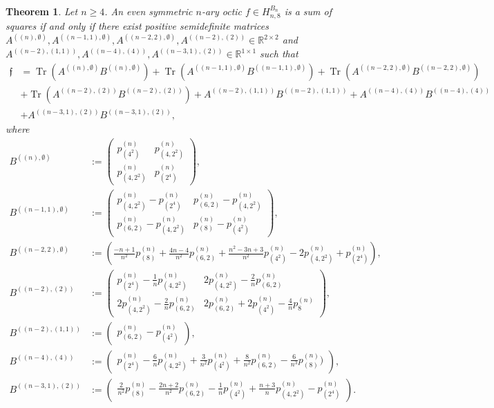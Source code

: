 \documentclass[11pt,a4paper]{amsart}
\numberwithin{equation}{section}
\newtheorem{thm}{Theorem}
\theoremstyle{definition}
\newcommand{\R}{\mathbb{R}}
\DeclareMathOperator{\Tr}{Tr}
\numberwithin{thm}{section}
\theoremstyle{break}
\numberwithin{subcase}{case}
\begin{document}
\begin{thm} \label{thm:EvenSymSOSOctics}
Let $n \geq 4$. An even symmetric $n$-ary octic $f \in H_{n,8}^{B_n}$ is a sum of squares if and only if there exist positive semidefinite matrices $A^{((n),\emptyset)},A^{((n-1,1),\emptyset)},A^{((n-2,2),\emptyset)},A^{((n-2),(2))} \in \R^{2 \times 2}$ and $A^{((n-2),(1,1))},A^{((n-4),(4))},A^{((n-3,1),(2))} \in \R^{1 \times 1}$ such that \begin{align*}
    \mathfrak{f} & = \Tr \left( A^{((n),\emptyset)}B^{((n),\emptyset)} \right) +\Tr \left( A^{((n-1,1),\emptyset)}B^{((n-1,1),\emptyset)} \right)+\Tr \left( A^{((n-2,2),\emptyset)}B^{((n-2,2),\emptyset)}\right) \\ & +\Tr \left( A^{((n-2),(2))}B^{((n-2),(2))} \right)+A^{((n-2),(1,1))}B^{((n-2),(1,1))}+A^{((n-4),(4))}B^{((n-4),(4))} \\ & +A^{((n-3,1),(2))}B^{((n-3,1),(2))},  
\end{align*} 
where 
\begin{align*}
    B^{((n),\emptyset)} & :=  \left( \begin{array}{cc} p_{(4^2)}^{(n)} & p_{(4,2^2)}^{(n)} \\ p_{(4,2^2)}^{(n)}&  p_{(2^4)}^{(n)} \end{array}\right),  \\
    B^{((n-1,1),\emptyset)} & :=  \left( \begin{array}{cc} p_{(4,2^2)}^{(n)} -p_{(2^4)}^{(n)} & p_{(6,2)}^{(n)}-p_{(4,2^2)}^{(n)} \\ p_{(6,2)}^{(n)}-p_{(4,2^2)}^{(n)} & p_{(8)}^{(n)}-p_{(4^2)}^{(n)} \end{array} \right), \\
     B^{((n-2,2),\emptyset)}   & :=  \left(  \frac{-n+1}{n^2}p_{(8)}^{(n)}+\frac{4n-4}{n^2}p_{(6,2)}^{(n)}+\frac{n^2-3n+3}{n^2}p_{(4^2)}^{(n)}-2p_{(4,2^2)}^{(n)}+p_{(2^4)}^{(n)}\right), \\
     B^{((n-2),(2))} & := \left( \begin{array}{cc}
        p_{(2^4)}^{(n)} - \frac{1}{n}p_{(4,2^2)}^{(n)}  &  2p_{(4,2^2)}^{(n)}-\frac{2}{n}p_{(6,2)}^{(n)} \\
        2p_{(4,2^2)}^{(n)}-\frac{2}{n}p_{(6,2)}^{(n)}  & 2p_{(6,2)}^{(n)} +2p_{(4^2)}^{(n)}-\frac{4}{n}p_8^{(n)} 
     \end{array} \right), \\
      B^{((n-2),(1,1))} & := \left( \begin{array}{c}  p_{(6,2)}^{(n)}-p_{(4^2)}^{(n)} \end{array}\right), \\
       B^{((n-4),(4))} &:= \left( \begin{array}{c} p_{(2^4)}^{(n)}-\frac{6}{n}p_{(4,2^2)}^{(n)}+\frac{3}{n^2}p_{(4^2)}^{(n)}+\frac{8}{n^2}p_{(6,2)}^{(n)}-\frac{6}{n^3}p_{(8)}^{(n)}) \end{array}\right), \\
        B^{((n-3,1),(2))} &:= \left( \begin{array}{c} \frac{2}{n^2}p_{(8)}^{(n)}-\frac{2n+2}{n^2}p_{(6,2)}^{(n)}-\frac{1}{n}p_{(4^2)}^{(n)}+\frac{n+3}{n}p_{(4,2^2)}^{(n)}-p_{(2^4)}^{(n)} \end{array} \right). 
\end{align*}
\end{thm}
\end{document}
